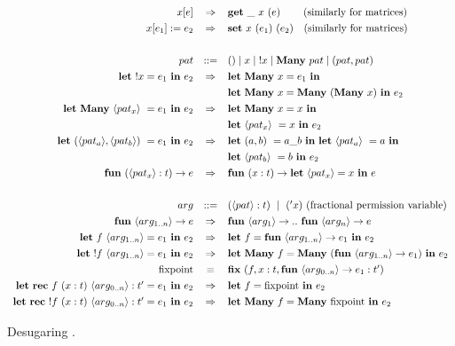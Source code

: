 \begin{figure}[p]
\begin{center}
\[\def\arraystretch{1.3}
    \begin{array}{rcl}
    x[e] &
    \Rightarrow &
    \ottkw{get}\ \_\ x\ (e) \:\qquad \textrm{(similarly for matrices)}
\\
    x[e_1] := e_2 &
    \Rightarrow &
    \ottkw{set}\ x\ (e_1)\ (e_2) \quad \textrm{(similarly for matrices)}
\\
\\
    pat & ::= & () \mid x \mid {!x} \mid \Many\ pat \mid (pat, pat)
\\
    \Let\ !x = e_1\ \In\ e_2 &
    \Rightarrow &
    \specialcell[t]{l}{%
        \Let\ \Many\ x = e_1\ \In \\
        \Let\ \Many\ x = \Many\ (\Many\ x)\ \In\ e_2}
\\
    \Let\ \Many\ \langle pat_x \rangle\ = e_1\ \In\ e_2 &
    \Rightarrow &
    \specialcell[t]{l}{%
        \Let\ \Many\ x = x\ \In \\
        \Let\ \langle pat_x \rangle\ = x\ \In\ e_2}
\\
    \Let\ (\langle pat_a \rangle, \langle pat_b \rangle)\ = e_1\ \In\ e_2 &
    \Rightarrow &
    \specialcell[t]{l}{%
        \Let\ (a,b)\ = a\_b\ \In\
        \Let\ \langle pat_a \rangle\ = a\ \In \\
        \Let\ \langle pat_b \rangle\ = b\ \In\ e_2}
\\
    \ottkw{fun}\ (\langle pat_x \rangle : t) \rightarrow e &
    \Rightarrow &
    \ottkw{fun}\ (x : t) \rightarrow \Let\ \langle pat_x \rangle = x\ \In\ e
\\
\\
    arg & ::= & (\langle pat \rangle : t)\ \mid\ ({'x}) \textrm{ (fractional permission variable)}
\\
    \ottkw{fun}\ \langle arg_{1 .. n} \rangle \rightarrow e &
    \Rightarrow &
    \ottkw{fun}\ \langle arg_1 \rangle \rightarrow ..
    \ \ottkw{fun}\ \langle arg_n \rangle \rightarrow e
\\
    \Let\ f\ {\langle arg_{1 .. n} \rangle} = e_1\ \In\ e_2 &
    \Rightarrow &
    \Let\ f = \ottkw{fun}\ {\langle arg_{1 .. n} \rangle} \rightarrow e_1\
    \In\ e_2
\\
    \Let\ !f\ {\langle arg_{1 .. n} \rangle} = e_1\ \In\ e_2 &
    \Rightarrow &
    \Let\ \Many\ f = \Many\ (\ottkw{fun}\ {\langle arg_{1 .. n} \rangle}
    \rightarrow e_1)\ \In\ e_2
\\
    \mathrm{fixpoint} & \equiv & \ottkw{fix}\ (f, x : t, \ottkw{fun}
    \ {\langle arg_{0 .. n} \rangle} \rightarrow e_1 : {t'} )
\\
    \Let\ \ottkw{rec}\ f\ (x : t)\ {\langle arg_{0 .. n} \rangle} : {t'} = e_1\ \In\ e_2 &
    \Rightarrow &
    \Let\ f = \mathrm{fixpoint}\ \In\ e_2
\\
    \Let\ \ottkw{rec}\ !f\ (x : t)\ {\langle arg_{0 .. n} \rangle} : {t'} = e_1\ \In\ e_2 &
    \Rightarrow &
    \Let\ \Many\ f = \Many\ \mathrm{fixpoint}\ \In\ e_2
    \end{array}
\]
\end{center}
\caption{Desugaring \lang.}\label{fig:lang_desugar}
\end{figure}

